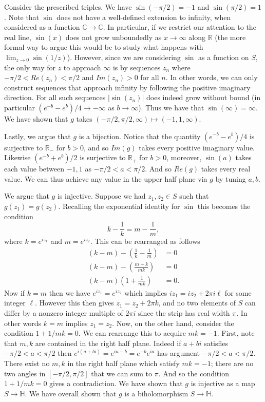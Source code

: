 \documentclass[12pt,letterpaper,boxed]{hmcpset}
\newcommand{\R}{\mathbb R}
\newcommand{\C}{\mathbb C}
\renewcommand{\H}{\mathbb H}
\newcommand{\abs}[1]{\left|#1\right|}
\begin{document}
\begin{solution}
Consider the prescribed triples.
We have $\sin(-\pi/2) = -1$ and $\sin(\pi/2) = 1$. 
Note that $\sin$ does not have a well-defined extension to infinity,
when considered as a function $\C \to \C$. In particular, if we
restrict our attention to the real line, $\sin(x)$ does not grow
unboundedly as $x \to \infty$ along $\R$ (the more formal way to argue
this would be to study what happens with $\lim_{z \to 0}\sin(1/z)$). 
However, since we are considering $\sin$ as a function on $S$, the
only way for $z$ to approach $\infty$ is by sequences $z_n$ where
$-\pi/2 < Re(z_n) < \pi/2$ and $Im(z_n) > 0$ for all $n$. 
In other words, we can only construct sequences that approach infinity
by following the positive imaginary direction. For all such sequences
$\abs{\sin(z_n)}$ does indeed grow without bound (in particular $(e^{-b} -
e^{b})/4 \to -\infty$ as $b \to \infty$). 
Thus we have that $\sin(\infty) = \infty$. 
We have shown that $g$ takes $(-\pi/2, \pi/2, \infty) \mapsto
(-1,1,\infty)$. 

Lastly, we argue that $g$ is a bijection. Notice that the quantity 
$(e^{-b} - e^{b})/4$ is surjective to $\R_-$ for $b>0$, and so $Im(g)$ takes every
positive imaginary value. Likewise $(e^{-b} + e^b) / 2$ is surjective
to $\R_+$ for $b > 0$, moreover, $\sin(a)$ takes each value between
$-1, 1$ as $-\pi/2 < a < \pi/2$. And so $Re(g)$ takes every real
value. We can thus achieve any value in the upper half plane via $g$
by tuning $a,b$. 

We argue that $g$ is injective. Suppose we had $z_1, z_2 \in S$ such
that $g(z_1) = g(z_2)$. Recalling the exponential identity for $\sin$
this becomes the condition 
\[
	k - \frac{1}{k} = m - \frac{1}{m},
\]
where $k = e^{iz_1}$ and $m = e^{iz_2}$. 
This can be rearranged as follows
\begin{align*}
	(k-m) - \left(\frac{1}{k} - \frac{1}{m}\right) &= 0\\
	(k-m)  - \left(\frac{m - k}{mk}\right) &= 0 \\
	(k-m)\left(1 + \frac{1}{mk}\right) &= 0.
\end{align*}
Now if $k = m$ then we have $e^{iz_1} = e^{iz_2}$ which implies 
$iz_1 = iz_2 + 2\pi i \ell$ for some integer $\ell$. However 
this then gives $z_1 = z_2 + 2\pi k$, and no two elements of $S$ can
differ by a nonzero integer multiple of $2\pi i$ since the strip has
real width $\pi$. In other words $k=m$ implies $z_1 = z_2$.
Now, on the other hand, consider the condition $1 + 1/mk = 0$.
We can rearrange this to acquire $mk = -1$. 
First, note that $m,k$ are contained in the right half plane. 
Indeed if $a + bi$ satisfies $-\pi/2 < a < \pi/2$ then
$e^{i (a+bi)} = e^{ia - b} = e^{-b} e^{ia}$ has argument $-\pi/2 < a <
\pi/2$. There exist no $m,k$ in the right half plane which satisfy $mk
= -1$; there are no two angles in $[-\pi/2, \pi/2]$ that we can sum
to $\pi$.  And so the condition $1 + 1/mk = 0$ gives a contradiction.
We have shown that $g$ is injective as a map $S \to \H$. 
We have overall shown that $g$ is a biholomorphism $S \to \H$. 


\end{solution}
\end{document}

